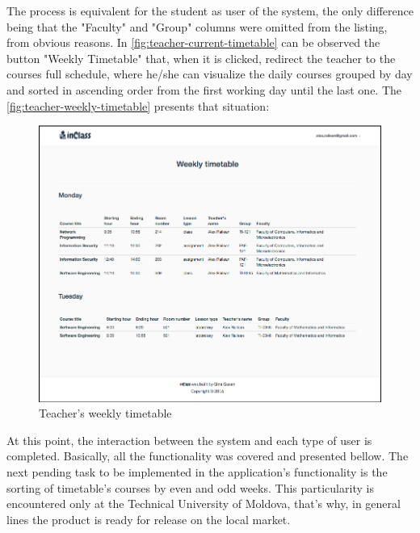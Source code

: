 The process is equivalent for the student as user of the system, the only difference being that the "Faculty" and "Group" columns were omitted from the listing, from obvious reasons. 
In \autoref{fig:teacher-current-timetable} can be observed the button "Weekly Timetable" that, when it is clicked, redirect the teacher to the courses full schedule, where he/she can visualize the daily courses grouped by day and sorted in ascending order from the first working day until the last one. The \autoref{fig:teacher-weekly-timetable} presents that situation:

\begin{figure}[H]
\centering
\includegraphics[width=14cm]{Chapter3/teacher-weekly-timetable.png}
\caption{Teacher's weekly timetable}
\label{fig:teacher-weekly-timetable}
\end{figure} 

At this point, the interaction between the system and each type of user is completed. Basically, all the functionality was covered and presented bellow. The next pending task to be implemented in the application's functionality is the sorting of timetable's courses by even and odd weeks. This particularity is encountered only at the Technical University of Moldova, that's why, in general lines the product is ready for release on the local market.

